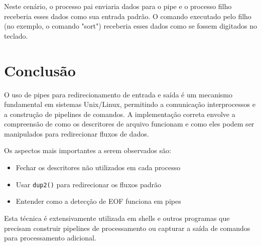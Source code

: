 \documentclass[12pt]{article}
\begin{document}
Neste cenário, o processo pai enviaria dados para o pipe e o processo filho receberia esses dados como sua entrada padrão. O comando executado pelo filho (no exemplo, o comando "sort") receberia esses dados como se fossem digitados no teclado.

\section{Conclusão}

O uso de pipes para redirecionamento de entrada e saída é um mecanismo fundamental em sistemas Unix/Linux, permitindo a comunicação interprocessos e a construção de pipelines de comandos. A implementação correta envolve a compreensão de como os descritores de arquivo funcionam e como eles podem ser manipulados para redirecionar fluxos de dados.

Os aspectos mais importantes a serem observados são:
\begin{itemize}
    \item Fechar os descritores não utilizados em cada processo
    \item Usar \texttt{dup2()} para redirecionar os fluxos padrão
    \item Entender como a detecção de EOF funciona em pipes
\end{itemize}

Esta técnica é extensivamente utilizada em shells e outros programas que precisam construir pipelines de processamento ou capturar a saída de comandos para processamento adicional.
\end{document}
